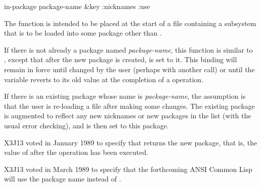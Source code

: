 \begin{obsolete}
\begin{defun}[Function]
in-package package-name &key :nicknames :use

The  function is intended to be placed at the start of a
file containing a subsystem that is to be loaded into some package other
than .

If there is not already a package named \emph{package-name}, this
function is similar to , except that after the
new package is created,  is set to it.  This binding will
remain in force until changed by the user (perhaps with another
 call) or until the  variable reverts to its
old value at the completion of a  operation.

If there is an existing package whose name is \emph{package-name}, the
assumption is that the user is re-loading a file after making some
changes.  The existing package is augmented to reflect any new nicknames
or new packages in the  list (with the usual error checking), and
 is then set to this package.
\end{defun}
\end{obsolete}

\begin{new}
X3J13 voted in January 1989
to specify that  returns the new package, that is, the
value of  after the operation has been executed.
\end{new}

\begin{newer}
X3J13 voted in March 1989  to specify that
the forthcoming ANSI Common Lisp will use the package name 
instead of .
\end{newer}

